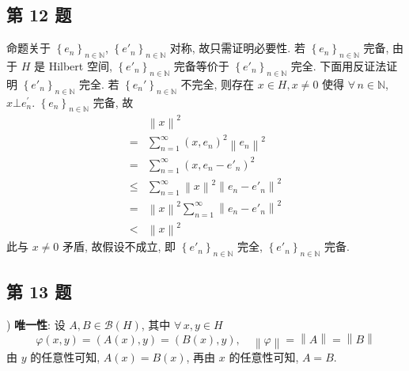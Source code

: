 \documentclass[\ROOT/main.tex]{subfiles}
\begin{document}
\subsection{第 12 题}
命题关于 $\left\{ e_n \right\}_{n \in \mathbb{N}}$, $\left\{ e'_n \right\}_{n \in \mathbb{N}}$ 对称, 故只需证明必要性.
若 $\left\{ e_n \right\}_{n \in \mathbb{N}}$ 完备, 由于 $H$ 是 Hilbert 空间, $\left\{ e'_n \right\}_{n \in \mathbb{N}}$ 完备等价于 $\left\{ e'_n \right\}_{n \in \mathbb{N}}$ 完全.
下面用反证法证明 $\left\{ e'_n \right\}_{n \in \mathbb{N}}$ 完全.
若 $\left\{ e_n{'} \right\}_{n \in \mathbb{N}}$ 不完全, 则存在 $x \in H, x \neq 0$ 使得 $\forall \, n \in \mathbb{N}$, $x \bot e_n^{'}$.
$\left\{ e_n \right\}_{n \in \mathbb{N}}$ 完备, 故
\begin{align*}
     & \left\| x \right\|^2 \\
    =& \sum_{n = 1}^{\infty} \left( x, e_n \right)^2 \left\| e_n \right\|^2 \\
    =& \sum_{n = 1}^{\infty} \left( x, e_n - e'_n \right)^2 \\
    \leqslant & \sum_{n = 1}^{\infty} \left\| x \right\|^2 \left\| e_n - e'_n \right\|^2 \\
    =& \left\| x \right\|^2 \sum_{n = 1}^{\infty} \left\| e_n - e'_n \right\|^2 \\
    <& \left\| x \right\|^2
\end{align*}
此与 $x \neq 0$ 矛盾, 故假设不成立, 即 $\left\{ e'_n \right\}_{n \in \mathbb{N}}$ 完全, $\left\{ e'_n \right\}_{n \in \mathbb{N}}$ 完备.

\subsection{第 13 题}
) \textbf{唯一性}:
设 $A, B \in \mathscr{B} \left( H \right)$, 其中 $\forall \, x, y \in H$
\[
    \varphi \left( x, y \right) = \left( A \left( x \right), y \right) = \left( B \left( x \right), y \right)
    , \quad
    \left\| \varphi \right\| = \left\| A \right\| = \left\| B \right\|
\]
由 $y$ 的任意性可知, $A \left( x \right) = B \left( x \right)$, 再由 $x$ 的任意性可知, $A = B$.
\end{document}
